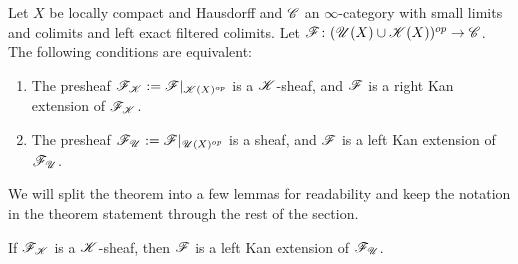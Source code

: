 \documentclass[../../thesis.tex]{subfiles}
\begin{document}
\begin{theorem}\label{7.3.4.9}
    Let $X$ be locally compact and Hausdorff and $\mathscr{C}$ an $\infty$-category  with small limits and colimits and left exact filtered colimits.
    Let $\mathscr{F} \colon (\mathscr{U}(X) \cup \mathscr{K}(X))^{op} \to \mathscr{C}$.
    The following conditions are equivalent:
    \begin{enumerate}[]
        \item The presheaf $\mathscr{F}_{\mathscr{K}}:= \mathscr{F}|_{\mathscr{K}(X)^{op}}$ is a $\mathscr{K}$-sheaf, and $\mathscr{F}$ is a right Kan extension of $\mathscr{F}_{\mathscr{K}}$.
        \item The presheaf $\mathscr{F}_{\mathscr{U}}:=\mathscr{F}|_{\mathscr{U}(X)^{op}}$ is a sheaf, and $\mathscr{F}$ is a left Kan extension of $\mathscr{F}_{\mathscr{U}}$.
    \end{enumerate}
\end{theorem}
We will split the theorem into a few lemmas for readability and keep the notation in the theorem statement through the rest of the section.
\begin{lemma}
    If $\mathscr{F}_{\mathscr{K}}$ is a $\mathscr{K}$-sheaf, then $\mathscr{F}$ is a left Kan extension of $\mathscr{F}_{\mathscr{U}}$.
\end{lemma}
\end{document}
